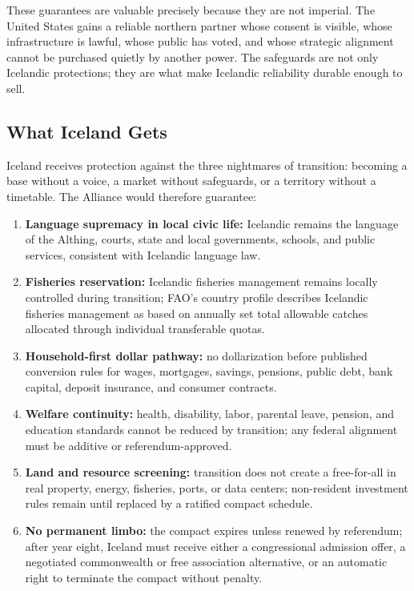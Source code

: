 \documentclass[11pt,a4paper]{article}
\begin{document}
These guarantees are valuable precisely because they are not imperial. The United States gains a reliable northern partner whose consent is visible, whose infrastructure is lawful, whose public has voted, and whose strategic alignment cannot be purchased quietly by another power. The safeguards are not only Icelandic protections; they are what make Icelandic reliability durable enough to sell.

\subsection{What Iceland Gets}
Iceland receives protection against the three nightmares of transition: becoming a base without a voice, a market without safeguards, or a territory without a timetable. The Alliance would therefore guarantee:

\begin{enumerate}
  \item \textbf{Language supremacy in local civic life:} Icelandic remains the language of the Althing, courts, state and local governments, schools, and public services, consistent with Icelandic language law.\cite{icelandlanguage}
  \item \textbf{Fisheries reservation:} Icelandic fisheries management remains locally controlled during transition; FAO's country profile describes Icelandic fisheries management as based on annually set total allowable catches allocated through individual transferable quotas.\cite{faoicelandfish}
  \item \textbf{Household-first dollar pathway:} no dollarization before published conversion rules for wages, mortgages, savings, pensions, public debt, bank capital, deposit insurance, and consumer contracts.
  \item \textbf{Welfare continuity:} health, disability, labor, parental leave, pension, and education standards cannot be reduced by transition; any federal alignment must be additive or referendum-approved.
  \item \textbf{Land and resource screening:} transition does not create a free-for-all in real property, energy, fisheries, ports, or data centers; non-resident investment rules remain until replaced by a ratified compact schedule.
  \item \textbf{No permanent limbo:} the compact expires unless renewed by referendum; after year eight, Iceland must receive either a congressional admission offer, a negotiated commonwealth or free association alternative, or an automatic right to terminate the compact without penalty.
\end{enumerate}
\end{document}
